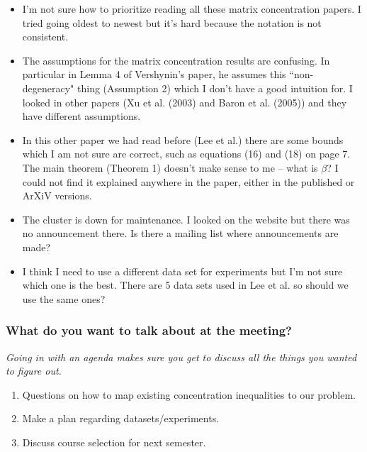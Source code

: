 \documentclass[10pt, letter]{article}
\begin{document}
\begin{note}
	\begin{itemize}
	\item I'm not sure how to prioritize reading all these matrix concentration papers. I tried going oldest to newest but it's hard because the notation is not consistent.
	\item The assumptions for the matrix concentration results are confusing.  In particular in Lemma 4 of Vershynin's paper, he assumes this ``non-degeneracy" thing (Assumption 2) which I don't have a good intuition for. I looked in other papers (Xu et al. (2003) and Baron et al. (2005)) and they have different assumptions.
	\item In this other paper we had read before (Lee et al.) there are some bounds which I am not sure are correct, such as equations (16) and (18) on page 7.  The main theorem (Theorem 1) doesn't make sense to me -- what is $\beta$? I could not find it explained anywhere in the paper, either in the published or ArXiV versions.
	\item The cluster is down for maintenance. I looked on the website but there was no announcement there. Is there a mailing list where announcements are made?
	\item I think I need to use a different data set for experiments but I'm not sure which one is the best. There are 5 data sets used in Lee et al. so should we use the same ones?
	\end{itemize}
\end{note}


\subsubsection*{What do you want to talk about at the meeting?}

\textit{Going in with an agenda makes sure you get to discuss all the things you wanted to figure out. }

\begin{note}
	\begin{enumerate}
	\item Questions on how to map existing concentration inequalities to our problem.
	\item Make a plan regarding datasets/experiments. 
	\item Discuss course selection for next semester.
	\end{enumerate}
\end{note}
\end{document}
